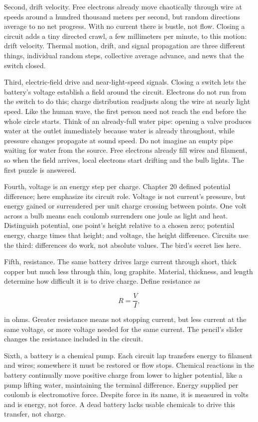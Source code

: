 Second, drift velocity. Free electrons already move chaotically through wire at speeds around a hundred thousand meters per second, but random directions average to no net progress. With no current there is bustle, not flow. Closing a circuit adds a tiny directed crawl, a few millimeters per minute, to this motion: drift velocity. Thermal motion, drift, and signal propagation are three different things, individual random steps, collective average advance, and news that the switch closed.

Third, electric-field drive and near-light-speed signals. Closing a switch lets the battery's voltage establish a field around the circuit. Electrons do not run from the switch to do this; charge distribution readjusts along the wire at nearly light speed. Like the human wave, the first person need not reach the end before the whole circle starts. Think of an already-full water pipe: opening a valve produces water at the outlet immediately because water is already throughout, while pressure changes propagate at sound speed. Do not imagine an empty pipe waiting for water from the source. Free electrons already fill wires and filament, so when the field arrives, local electrons start drifting and the bulb lights. The first puzzle is answered.

Fourth, voltage is an energy step per charge. Chapter 20 defined potential difference; here emphasize its circuit role. Voltage is not current's pressure, but energy gained or surrendered per unit charge crossing between points. One volt across a bulb means each coulomb surrenders one joule as light and heat. Distinguish potential, one point's height relative to a chosen zero; potential energy, charge times that height; and voltage, the height difference. Circuits use the third: differences do work, not absolute values. The bird's secret lies here.

Fifth, resistance. The same battery drives large current through short, thick copper but much less through thin, long graphite. Material, thickness, and length determine how difficult it is to drive charge. Define resistance as

\[
R=\frac{V}{I},
\]

in ohms. Greater resistance means not stopping current, but less current at the same voltage, or more voltage needed for the same current. The pencil's slider changes the resistance included in the circuit.

Sixth, a battery is a chemical pump. Each circuit lap transfers energy to filament and wires; somewhere it must be restored or flow stops. Chemical reactions in the battery continually move positive charge from lower to higher potential, like a pump lifting water, maintaining the terminal difference. Energy supplied per coulomb is electromotive force. Despite force in its name, it is measured in volts and is energy, not force. A dead battery lacks usable chemicals to drive this transfer, not charge.


